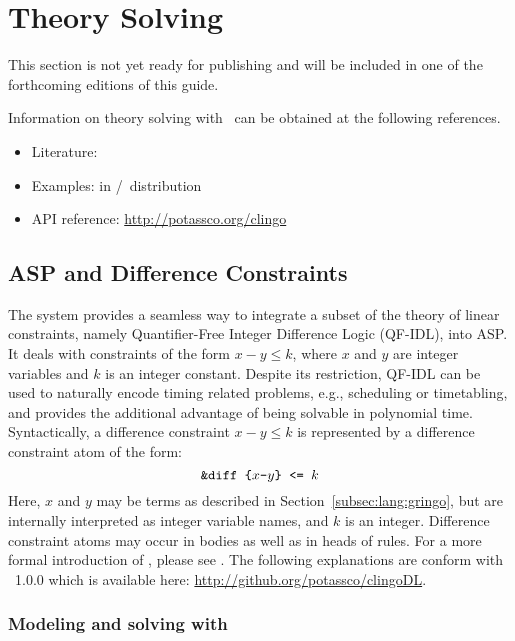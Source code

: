 \section{Theory Solving}\label{sec:theory}

This section is not yet ready for publishing
and will be included in one of the forthcoming editions of this guide.

Information on theory solving with \clingo\ can be obtained at the following references.

\begin{itemize}
\item Literature: \cite{gekakaosscwa16a,kascwa17a}
\item Examples:  in \gringo/\clingo\ distribution
\item API reference: \url{http://potassco.org/clingo}
\end{itemize}

\subsection{ASP and Difference Constraints}
\label{sec:difference:constraints}

The system  provides a seamless way to integrate a subset of the theory of linear constraints, namely Quantifier-Free Integer Difference Logic (QF-IDL), into ASP.
It deals with constraints of the form $x-y\leq k$, where $x$ and $y$ are integer variables and $k$ is an integer constant.
Despite its restriction, QF-IDL can be used to naturally encode timing related problems, e.g., scheduling or timetabling, and provides the additional advantage of being solvable in polynomial time.
Syntactically, a difference constraint $x-y\leq k$ is represented by a difference constraint atom of the form:
 $$
    \texttt{\&diff\text{ }\{$x$-$y$\}\text{ }<=\text{ }$k$}
 $$
Here, $x$ and $y$ may be terms as described in Section~\ref{subsec:lang:gringo}, but are internally interpreted as integer variable names,
and $k$ is an integer.
Difference constraint atoms may occur in bodies as well as in heads of rules.
For a more formal introduction of , please see \cite{jakaosscscwa17a}.
The following explanations are conform with ~1.0.0 which is available here: \url{http://github.org/potassco/clingoDL}.


\subsubsection{Modeling and solving with }

